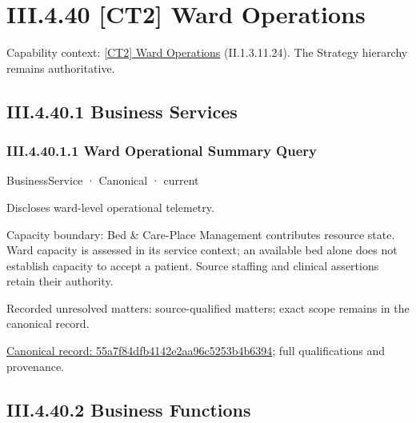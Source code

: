 \section*{III.4.40 [CT2] Ward Operations}
\label{navigation:III.4.40}

{\small Capability context: \hyperref[element:f996ecca728f4942a88b034aca818a99]{[CT2] Ward Operations} (II.1.3.11.24). The Strategy hierarchy remains authoritative.}\par
\subsection*{III.4.40.1 Business Services}
\label{navigation:III.4.40.1}

\subsubsection*{III.4.40.1.1 Ward Operational Summary Query}
\label{navigation:III.4.40.1.1}

\label{element:55a7f84dfb4142e2aa96c5253b4b6394}
{\small BusinessService · Canonical · current}\par

Discloses ward-level operational telemetry.



Capacity boundary: Bed \& Care-Place Management contributes resource state. Ward capacity is assessed in its service context; an available bed alone does not establish capacity to accept a patient. Source staffing and clinical assertions retain their authority.


{\small Recorded unresolved matters: source-qualified matters; exact scope remains in the canonical record.}\par
{\footnotesize \href{../../../../continuum/business/business-service/55a7f84dfb4142e2aa96c5253b4b6394.md}{Canonical record: 55a7f84dfb4142e2aa96c5253b4b6394}; full qualifications and provenance.}\par
\subsection*{III.4.40.2 Business Functions}
\label{navigation:III.4.40.2}

